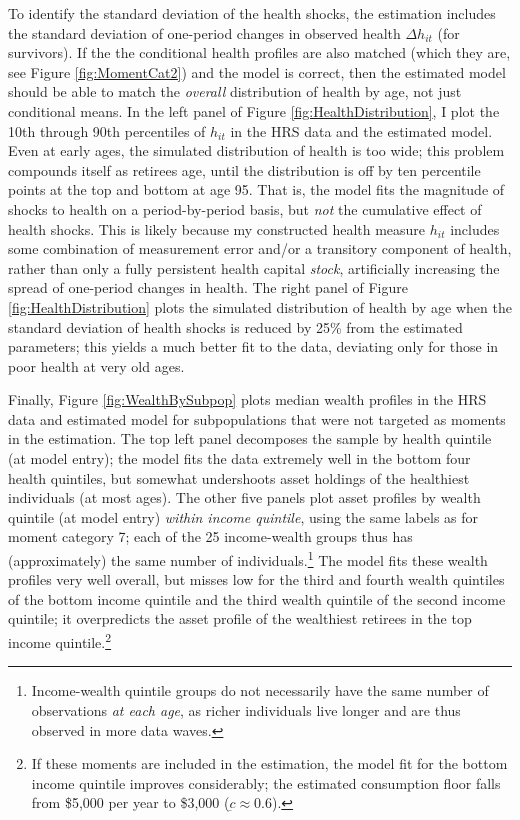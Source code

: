 \documentclass[12pt,pdftex,letterpaper]{article}
\newcommand{\Health}{h}
\newcommand{\Con}{c}
\newcommand{\ConFloor}{\underbar{\Con}}
\begin{document}
To identify the standard deviation of the health shocks, the estimation includes the standard deviation of one-period changes in observed health $\Delta \Health_{it}$ (for survivors).  If the the conditional health profiles are also matched (which they are, see Figure \ref{fig:MomentCat2}) and the model is correct, then the estimated model should be able to match the \textit{overall} distribution of health by age, not just conditional means.  In the left panel of Figure \ref{fig:HealthDistribution}, I plot the 10th through 90th percentiles of $\Health_{it}$ in the HRS data and the estimated model.  Even at early ages, the simulated distribution of health is too wide; this problem compounds itself as retirees age, until the distribution is off by ten percentile points at the top and bottom at age 95.  That is, the model fits the magnitude of shocks to health on a period-by-period basis, but \textit{not} the cumulative effect of health shocks.  This is likely because my constructed health measure $\Health_{it}$ includes some combination of measurement error and/or a transitory component of health, rather than only a fully persistent health capital \textit{stock}, artificially increasing the spread of one-period changes in health.  The right panel of Figure \ref{fig:HealthDistribution} plots the simulated distribution of health by age when the standard deviation of health shocks is reduced by 25\% from the estimated parameters; this yields a much better fit to the data, deviating only for those in poor health at very old ages.

Finally, Figure \ref{fig:WealthBySubpop} plots median wealth profiles in the HRS data and estimated model for subpopulations that were not targeted as moments in the estimation.  The top left panel decomposes the sample by health quintile (at model entry); the model fits the data extremely well in the bottom four health quintiles, but somewhat undershoots asset holdings of the healthiest individuals (at most ages).  The other five panels plot asset profiles by wealth quintile (at model entry) \textit{within income quintile}, using the same labels as for moment category 7; each of the 25 income-wealth groups thus has (approximately) the same number of individuals.\footnote{Income-wealth quintile groups do not necessarily have the same number of observations \textit{at each age}, as richer individuals live longer and are thus observed in more data waves.}  The model fits these wealth profiles very well overall, but misses low for the third and fourth wealth quintiles of the bottom income quintile and the third wealth quintile of the second income quintile; it overpredicts the asset profile of the wealthiest retirees in the top income quintile.\footnote{If these moments are included in the estimation, the model fit for the bottom income quintile improves considerably; the estimated consumption floor falls from \$5,000 per year to \$3,000 ($\ConFloor \approx 0.6$).}
\end{document}
